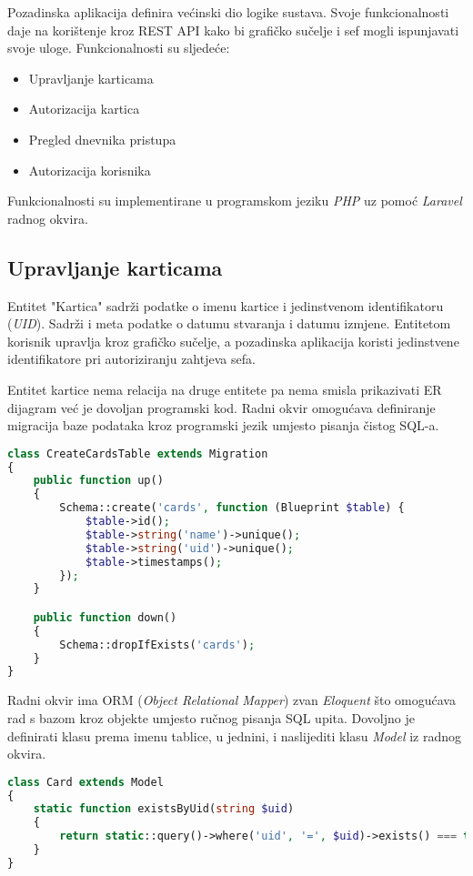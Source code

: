 Pozadinska aplikacija definira većinski dio logike sustava.
Svoje funkcionalnosti daje na korištenje kroz REST API kako bi grafičko sučelje i sef mogli ispunjavati svoje uloge.
Funkcionalnosti su sljedeće:

\begin{itemize}
    \item Upravljanje karticama
    \item Autorizacija kartica
    \item Pregled dnevnika pristupa
    \item Autorizacija korisnika
\end{itemize}

Funkcionalnosti su implementirane u programskom jeziku \textit{PHP} uz pomoć \textit{Laravel} radnog okvira.

\subsection{Upravljanje karticama}

Entitet "Kartica" sadrži podatke o imenu kartice i jedinstvenom identifikatoru (\textit{UID}).
Sadrži i meta podatke o datumu stvaranja i datumu izmjene.
Entitetom korisnik upravlja kroz grafičko sučelje, a pozadinska aplikacija koristi jedinstvene identifikatore pri autoriziranju
zahtjeva sefa.

Entitet kartice nema relacija na druge entitete pa nema smisla prikazivati ER dijagram već je dovoljan programski kod.
Radni okvir omogućava definiranje migracija baze podataka kroz programski jezik umjesto pisanja čistog SQL-a.

\begin{lstlisting}[language=PHP]
class CreateCardsTable extends Migration
{
    public function up()
    {
        Schema::create('cards', function (Blueprint $table) {
            $table->id();
            $table->string('name')->unique();
            $table->string('uid')->unique();
            $table->timestamps();
        });
    }

    public function down()
    {
        Schema::dropIfExists('cards');
    }
}
\end{lstlisting}

Radni okvir ima ORM (\textit{Object Relational Mapper}) zvan \textit{Eloquent} što omogućava rad s bazom kroz objekte
umjesto ručnog pisanja SQL upita.
Dovoljno je definirati klasu prema imenu tablice, u jednini, i naslijediti klasu \textit{Model} iz radnog okvira.

\begin{lstlisting}[language=PHP]
class Card extends Model
{
    static function existsByUid(string $uid)
    {
        return static::query()->where('uid', '=', $uid)->exists() === true;
    }
}
\end{lstlisting}

